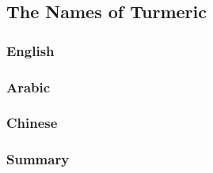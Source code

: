 \subsection{The Names of Turmeric}
\label{sec:names_of_turmeric}

\subsubsection{English}





\subsubsection{Arabic}



\subsubsection{Chinese}



\subsubsection{Summary}




















